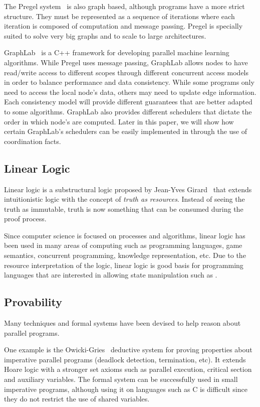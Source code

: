 The Pregel system~\cite{Malewicz:2010:PSL:1807167.1807184} is also graph based, although programs have a more strict
structure. They must be represented as a sequence of iterations where each iteration is composed of computation and message passing.
Pregel is specially suited to solve very big graphs
and to scale to large architectures.

GraphLab~\cite{GraphLab2010} is a C++ framework for developing parallel machine learning
algorithms. While Pregel uses message passing, GraphLab allows nodes to have read/write
access to different scopes through different concurrent access models in order to balance
performance and data consistency. While some programs only need to access the local node's
data, others may need to update edge information. Each consistency model will provide different
guarantees that are better adapted to some algorithms. GraphLab also provides different
schedulers that dictate the order in which node's are computed. Later in this paper, we will
show how certain GraphLab's schedulers can be easily implemented in \lang through the use of
coordination facts.

\subsection{Linear Logic}

Linear logic is a substructural logic proposed by Jean-Yves Girard~\cite{Girard95logic:its} that extends intuitionistic logic with the concept of \emph{truth as resources}. Instead of seeing the truth as immutable, truth is now something that can be consumed during the proof process.

Since computer science is focused on processes and algorithms, linear logic has been used
in many areas of computing such as programming languages, game semantics, concurrent programming, knowledge representation, etc.
Due to the resource interpretation of the logic, linear logic is good basis for programming
languages that are interested in allowing state manipulation such as \lang .

\subsection{Provability}

Many techniques and formal systems have been devised to help reason about parallel programs.

One example is the Owicki-Gries~\cite{Owicki:1976:VPP:360051.360224} deductive system
for proving properties about imperative parallel programs (deadlock detection, termination, etc).
It extends Hoare logic with a stronger set axioms such as parallel execution, critical section
and auxiliary variables. The formal system can be successfully used in small imperative
programs, although using it on languages such as C is difficult since they do not
restrict the use of shared variables.

